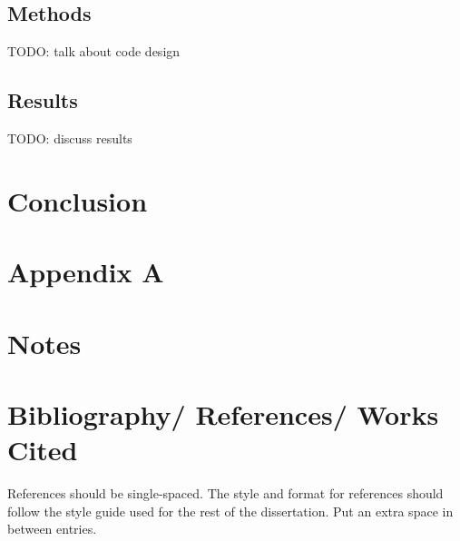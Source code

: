 \documentclass[12pt,oneside, letterpaper]{book}
\begin{document}
\section{Methods}
\par TODO: talk about code design

\section{Results}
\par TODO: discuss results

\chapter{Conclusion}

\newpage
\chapter*{Appendix A}


\newpage
\chapter*{Notes}

\newpage
{}
\chapter*{Bibliography/ References/ Works Cited}
\fontsize{10}{10pt} \selectfont
References should be single-spaced. The style and format for references should follow the style guide used for the rest of the dissertation. \newline \newline
Put an extra space in between entries.

\end{document}

